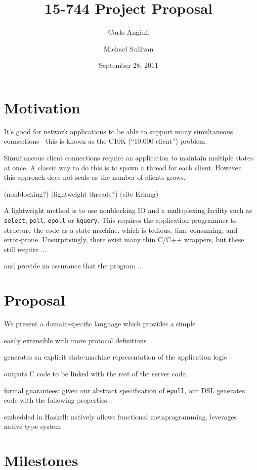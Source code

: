 \documentclass{article}
\title{15-744 Project Proposal}
\author{Carlo Angiuli \and Michael Sullivan}
\date{September 28, 2011}
\renewcommand{\t}{\texttt}
\begin{document}
\maketitle


\section{Motivation}

It's good for network applications to be able to support many simultaneous
connections---this is known as the C10K (``10,000 client'') problem\cite{c10k}. 

Simultaneous client connections require an application to maintain multiple
states at once. A classic way to do this is to spawn a thread for each client.
However, this approach does not scale as the number of clients grows. 

(nonblocking?)
(lightweight threads?)
(cite Erlang)

A lightweight method is to use nonblocking IO and a multiplexing
facility such as \t{select}, \t{poll}, \t{epoll} or \t{kquery}.  This
requires the application programmer to structure the code as a state
machine, which is tedious, time-consuming, and error-prone. 
Unsurprisingly, there exist many thin
C/C++ wrappers, but these still require ...

and provide no assurance that the program ...

\section{Proposal}

We present a domain-specific language which provides a simple

easily extensible with more protocol definitions

generates an explicit state-machine representation of the application logic

outputs C code to be linked with the rest of the server code.

formal guarantees: given our abstract specification of \t{epoll}, our DSL
generates code with the following properties...

embedded in Haskell: natively allows functional metaprogramming,
leverages native type system

\section{Milestones}



{}

\end{document}
